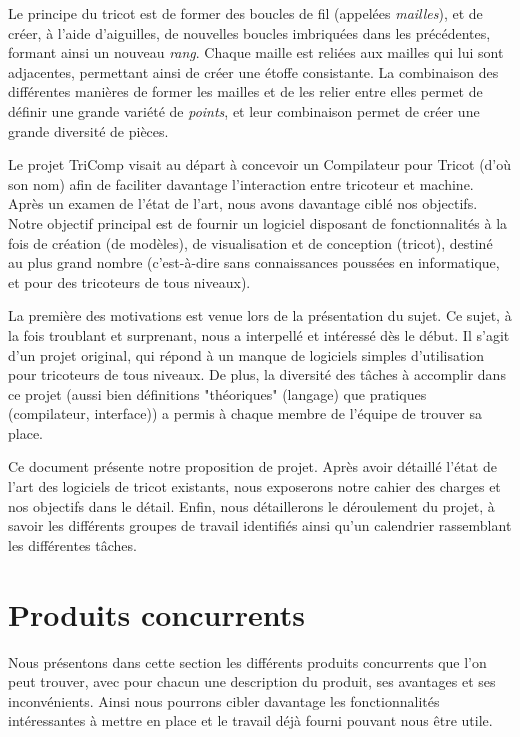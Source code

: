 \documentclass{article}
\begin{document}
Le principe du tricot est de former des boucles de fil (appelées \emph{mailles}), et de créer, à l'aide d'aiguilles, de nouvelles boucles
imbriquées dans les précédentes, formant ainsi un nouveau \emph{rang}. Chaque maille est reliées aux mailles qui lui sont adjacentes,
permettant ainsi de créer une étoffe consistante. La combinaison des différentes manières de former les mailles et de les relier entre elles
permet de définir une grande variété de \emph{points}, et leur combinaison permet de créer une grande diversité de pièces.

Le projet TriComp visait au départ à concevoir un Compilateur pour Tricot (d'où son nom) afin de faciliter davantage l'interaction entre
tricoteur et machine. Après un examen de l'état de l'art, nous avons davantage ciblé nos objectifs. Notre objectif principal est de
fournir un logiciel disposant de fonctionnalités à la fois de création (de modèles), de visualisation et de conception (tricot),
destiné au plus grand nombre (c'est-à-dire sans connaissances poussées en informatique, et pour des tricoteurs de tous niveaux).

La première des motivations est venue lors de la présentation du sujet. Ce sujet, à la fois troublant et surprenant, nous a interpellé et
intéressé dès le début. Il s'agit d'un projet original, qui répond à un manque de logiciels simples d'utilisation pour tricoteurs de tous
niveaux. De plus, la diversité des tâches à accomplir dans ce projet (aussi bien définitions "théoriques" (langage) que pratiques
(compilateur, interface)) a permis à chaque membre de l'équipe de trouver sa place.

Ce document présente notre proposition de projet. Après avoir détaillé l'état de l'art des logiciels de tricot existants, nous exposerons
notre cahier des charges et nos objectifs dans le détail. Enfin, nous détaillerons le déroulement du projet, à savoir les différents
groupes de travail identifiés ainsi qu'un calendrier rassemblant les différentes tâches.



\section{Produits concurrents}

Nous présentons dans cette section les différents produits concurrents que l'on peut trouver, avec pour chacun une description du produit,
ses avantages et ses inconvénients. Ainsi nous pourrons cibler davantage les fonctionnalités intéressantes à mettre en place et le
travail déjà fourni pouvant nous être utile.
\end{document}
